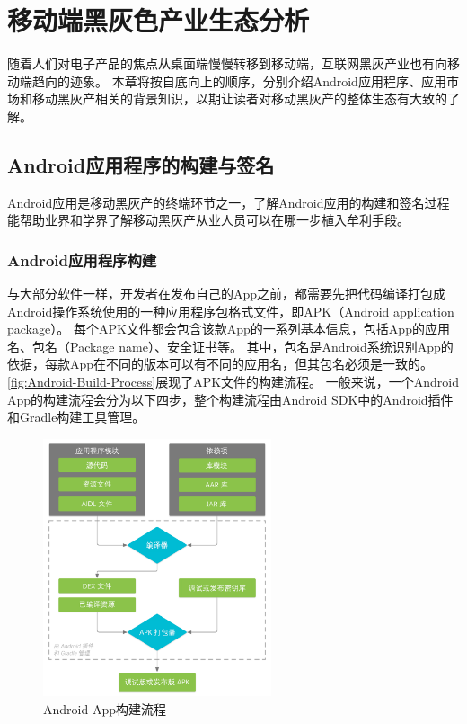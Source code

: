 \chapter{移动端黑灰色产业生态分析}
\label{chp:background}

随着人们对电子产品的焦点从桌面端慢慢转移到移动端，互联网黑灰产业也有向移动端趋向的迹象。
本章将按自底向上的顺序，分别介绍Android应用程序、应用市场和移动黑灰产相关的背景知识，以期让读者对移动黑灰产的整体生态有大致的了解。

\section{Android应用程序的构建与签名}
\label{sec:signature}

Android应用是移动黑灰产的终端环节之一，了解Android应用的构建和签名过程能帮助业界和学界了解移动黑灰产从业人员可以在哪一步植入牟利手段。

\subsection{Android应用程序构建}

与大部分软件一样，开发者在发布自己的App之前，都需要先把代码编译打包成Android操作系统使用的一种应用程序包格式文件，即APK（Android application package）。
每个APK文件都会包含该款App的一系列基本信息，包括App的应用名、包名（Package name）、安全证书等。
其中，包名是Android系统识别App的依据，每款App在不同的版本可以有不同的应用名，但其包名必须是一致的。
\autoref{fig:Android-Build-Process}展现了APK文件的构建流程。
一般来说，一个Android App的构建流程会分为以下四步，整个构建流程由Android SDK中的Android插件和Gradle构建工具管理。

\begin{figure}[htbp]
	\centering
	\includegraphics[width=0.6\textwidth]{./Figures/edwin-build-process-CHN.png}
	\caption{Android App构建流程}
	\label{fig:Android-Build-Process}
\end{figure}

